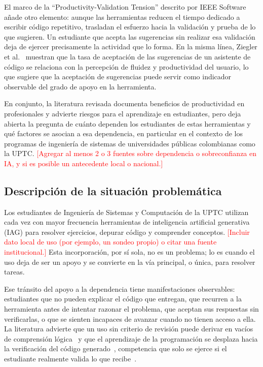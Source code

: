 \documentclass[12pt,letterpaper]{article}
\newcommand{\pendiente}[1]{\textcolor{red}{[#1]}}
\begin{document}
El marco de la ``Productivity-Validation Tension'' descrito por IEEE Software~\cite{ieee2024assisted} añade otro elemento: aunque las herramientas reducen el tiempo dedicado a escribir código repetitivo, trasladan el esfuerzo hacia la validación y prueba de lo que sugieren. Un estudiante que acepta las sugerencias sin realizar esa validación deja de ejercer precisamente la actividad que lo forma. En la misma línea, Ziegler et al.~\cite{ziegler2022measuring} muestran que la tasa de aceptación de las sugerencias de un asistente de código se relaciona con la percepción de fluidez y productividad del usuario, lo que sugiere que la aceptación de sugerencias puede servir como indicador observable del grado de apoyo en la herramienta.

En conjunto, la literatura revisada documenta beneficios de productividad en profesionales y advierte riesgos para el aprendizaje en estudiantes, pero deja abierta la pregunta de cuánto dependen los estudiantes de estas herramientas y qué factores se asocian a esa dependencia, en particular en el contexto de los programas de ingeniería de sistemas de universidades públicas colombianas como la UPTC. \pendiente{Agregar al menos 2 o 3 fuentes sobre dependencia o sobreconfianza en IA, y si es posible un antecedente local o nacional.}

\subsection{Descripción de la situación problemática}

Los estudiantes de Ingeniería de Sistemas y Computación de la UPTC utilizan cada vez con mayor frecuencia herramientas de inteligencia artificial generativa (IAG) para resolver ejercicios, depurar código y comprender conceptos. \pendiente{Incluir dato local de uso (por ejemplo, un sondeo propio) o citar una fuente institucional.} Esta incorporación, por sí sola, no es un problema; lo es cuando el uso deja de ser un apoyo y se convierte en la vía principal, o única, para resolver tareas.

Ese tránsito del apoyo a la dependencia tiene manifestaciones observables: estudiantes que no pueden explicar el código que entregan, que recurren a la herramienta antes de intentar razonar el problema, que aceptan sus respuestas sin verificarlas, o que se sienten incapaces de avanzar cuando no tienen acceso a ella. La literatura advierte que un uso sin criterio de revisión puede derivar en vacíos de comprensión lógica~\cite{martinovic2024ai} y que el aprendizaje de la programación se desplaza hacia la verificación del código generado~\cite{prather2023programming}, competencia que solo se ejerce si el estudiante realmente valida lo que recibe~\cite{ieee2024assisted}.
\end{document}
